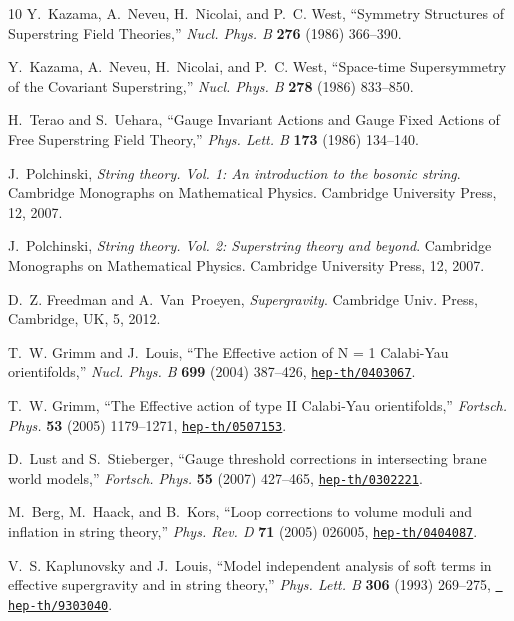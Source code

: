 \documentclass[12pt,a4paper]{article}
\begin{document}
\begin{thebibliography}{10}
	Y.~Kazama, A.~Neveu, H.~Nicolai, and P.~C. West, ``{Symmetry Structures of
		Superstring Field Theories},'' {\em Nucl. Phys. B} {\bf 276} (1986) 366--390.
	
	Y.~Kazama, A.~Neveu, H.~Nicolai, and P.~C. West, ``{Space-time Supersymmetry of
		the Covariant Superstring},'' {\em Nucl. Phys. B} {\bf 278} (1986) 833--850.
	
	H.~Terao and S.~Uehara, ``{Gauge Invariant Actions and Gauge Fixed Actions of
		Free Superstring Field Theory},'' {\em Phys. Lett. B} {\bf 173} (1986)
	134--140.
	
	J.~Polchinski, {\em {String theory. Vol. 1: An introduction to the bosonic
			string}}.
	\newblock Cambridge Monographs on Mathematical Physics. Cambridge University
	Press, 12, 2007.
	
	J.~Polchinski, {\em {String theory. Vol. 2: Superstring theory and beyond}}.
	\newblock Cambridge Monographs on Mathematical Physics. Cambridge University
	Press, 12, 2007.
	
	D.~Z. Freedman and A.~Van~Proeyen, {\em {Supergravity}}.
	\newblock Cambridge Univ. Press, Cambridge, UK, 5, 2012.
	
	T.~W. Grimm and J.~Louis, ``{The Effective action of N = 1 Calabi-Yau
		orientifolds},'' {\em Nucl. Phys. B} {\bf 699} (2004) 387--426,
	\href{http://www.arXiv.org/abs/hep-th/0403067}{{\tt hep-th/0403067}}.
	
	T.~W. Grimm, ``{The Effective action of type II Calabi-Yau orientifolds},''
	{\em Fortsch. Phys.} {\bf 53} (2005) 1179--1271,
	\href{http://www.arXiv.org/abs/hep-th/0507153}{{\tt hep-th/0507153}}.
	
	D.~Lust and S.~Stieberger, ``{Gauge threshold corrections in intersecting brane
		world models},'' {\em Fortsch. Phys.} {\bf 55} (2007) 427--465,
	\href{http://www.arXiv.org/abs/hep-th/0302221}{{\tt hep-th/0302221}}.
	
	M.~Berg, M.~Haack, and B.~Kors, ``{Loop corrections to volume moduli and
		inflation in string theory},'' {\em Phys. Rev. D} {\bf 71} (2005) 026005,
	\href{http://www.arXiv.org/abs/hep-th/0404087}{{\tt hep-th/0404087}}.
	
	V.~S. Kaplunovsky and J.~Louis, ``{Model independent analysis of soft terms in
		effective supergravity and in string theory},'' {\em Phys. Lett. B} {\bf 306}
	(1993) 269--275, \href{http://www.arXiv.org/abs/hep-th/9303040}{{\tt
			hep-th/9303040}}.
	

\end{thebibliography}
\end{document}
